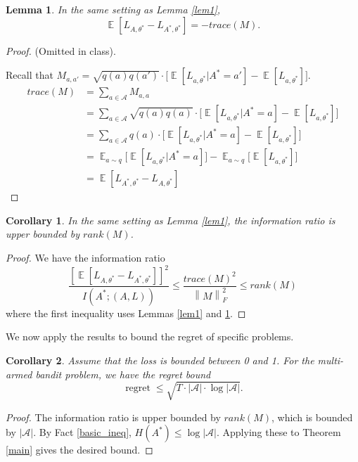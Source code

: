 \documentclass[11pt]{article}
\newtheorem{corollary}{Corollary}[theorem]
\newtheorem{lemma}[theorem]{Lemma}
\DeclareMathOperator*{\E}{\mathbb{E}}
\DeclareMathOperator{\reg}{regret}
\newcommand{\norm}[1]{\left\lVert#1\right\rVert}
\begin{document}
\begin{lemma}\label{lem2}
In the same setting as Lemma \ref{lem1}, 
\begin{equation*}
    \E[L_{A,\theta^*} - L_{A^*, \theta^*}] = -trace(M).
\end{equation*}
\end{lemma}
\begin{proof}
(Omitted in class).


Recall that $M_{a,a'}=\sqrt{q(a)q(a')} \cdot \Big[\E[L_{a,\theta^*} | A^* = a'] - \E[L_{a,\theta^*}]\Big]$.
\begin{align*}
    trace(M) &= \sum_{a \in \mathcal{A}} M_{a,a} \\
    &= \sum_{a\in\mathcal{A}} \sqrt{q(a)q(a)}  \cdot \Big[\E[L_{a,\theta^*} | A^* = a] - \E[L_{a,\theta^*}]\Big] \\
    &= \sum_{a\in\mathcal{A}} q(a)  \cdot \Big[\E[L_{a,\theta^*} | A^* = a] - \E[L_{a,\theta^*}]\Big] \\
    &= \E_{a\sim q}\big[\E[L_{a,\theta^*}|A^*=a]\big] - \E_{a\sim q}\big[\E[L_{a,\theta^*}]\big] \\
    &= \E[L_{A^*,\theta^*} - L_{A,\theta^*}]
\end{align*}
\end{proof}

\begin{corollary}
In the same setting as Lemma \ref{lem1}, the information ratio is upper bounded by $rank(M)$.
\end{corollary}
\begin{proof}
We have the information ratio
\begin{equation*}
    \frac{[\E[L_{A,\theta^*} - L_{A^*, \theta^*}]]^2}{I(A^*;(A,L))} \le \frac{trace(M)^2}{\norm{M}_F^2} \le rank(M)
\end{equation*}
where the first inequality uses Lemmas \ref{lem1} and \ref{lem2}.
\end{proof}

We now apply the results to bound the regret of specific problems.

\begin{corollary}
Assume that the loss is bounded between 0 and 1. For the multi-armed bandit problem, we have the regret bound
\begin{equation*}
    \reg \le \sqrt{T \cdot |\mathcal{A}| \cdot \log|\mathcal{A}|}.
\end{equation*}
\end{corollary}
\begin{proof}
The information ratio is upper bounded by $rank(M)$, which is bounded by $|\mathcal{A}|$. By Fact \ref{basic_ineq}, $H(A^*) \le \log|\mathcal{A}|$. Applying these to Theorem \ref{main} gives the desired bound.
\end{proof}
\end{document}
